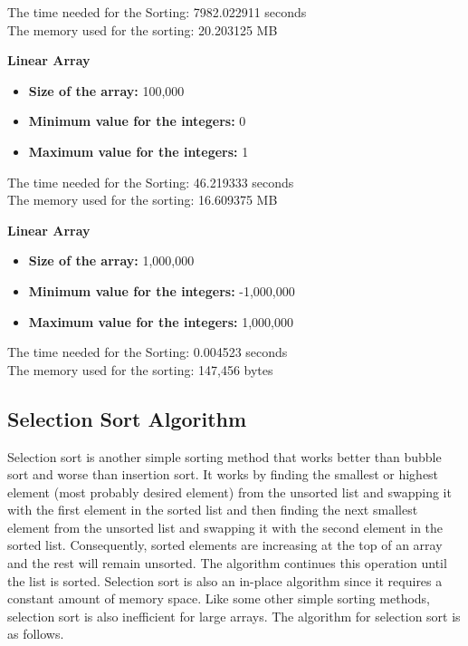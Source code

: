 \documentclass{article}
\begin{document}
The time needed for the Sorting: 7982.022911 seconds \\
The memory used for the sorting: 20.203125 MB

\textbf{Linear Array}

\begin{itemize}
    \item \textbf{Size of the array:} 100,000
    \item \textbf{Minimum value for the integers:} 0
    \item \textbf{Maximum value for the integers:} 1
\end{itemize}

The time needed for the Sorting: 46.219333 seconds \\
The memory used for the sorting: 16.609375 MB

\textbf{Linear Array}

\begin{itemize}
    \item \textbf{Size of the array:} 1,000,000
    \item \textbf{Minimum value for the integers:} -1,000,000
    \item \textbf{Maximum value for the integers:} 1,000,000
\end{itemize}

The time needed for the Sorting: 0.004523 seconds \\
The memory used for the sorting: 147,456 bytes



\subsection{Selection Sort Algorithm}

Selection sort is another simple sorting method that works better than bubble sort
and worse than insertion sort. It works by finding the smallest or highest element
(most probably desired element) from the unsorted list and swapping it with the first element in the sorted list and then finding the next smallest element from the unsorted
list and swapping it with the second element in the sorted list. Consequently, sorted elements are increasing at the top of an array and the rest will remain unsorted. The
algorithm continues this operation until the list is sorted. Selection sort is also
an in-place algorithm since it requires a constant amount of memory space. Like
some other simple sorting methods, selection sort is also inefficient for large arrays.
The algorithm for selection sort is as follows.\cite{karunanithi2014survey}
\end{document}
